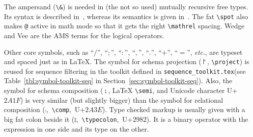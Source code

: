 \documentclass{article}
\newcommand{\emfile}[1]{\texttt{#1}}%
\newcommand{\seqtkfile}{\emfile{sequence\_toolkit.tex}}
\begin{document}
%
The ampersand (\verb|\&|) is needed in (the not so used) mutually
recursive free types. Its syntax is described in~\cite[8.2]{isoz},
whereas its semantics is given in~\cite[14.2.3.1]{isoz}.
The fat \verb|\spot| also makes \verb|@| active in math mode
so that it gets the right \verb|\mathrel| spacing.
Wedge and Vee are the AMS terms for the logical operators.

Other core symbols, such as ``$/$'', ``$;$'', ``$:$'', ``$,$'',
``$.$'', ``$+$'', ``$=$'', \textit{etc.}, are typeset and spaced
just as in \LaTeX. The symbol for schema projection ($\project$,
\verb|\project|) is reused for sequence filtering in the
toolkit defined in \seqtkfile (see Table~\ref{tbl:symbol-toolkit-seq} in Section~\ref{sec:symbol-toolkit-seq}).
Also, the symbol for schema composition ($\semi$, \LaTeX{} \verb|\semi|, and Unicode character U+$2A1F$)
is very similar (but slightly bigger) than the symbol for relational
composition ($\comp$,~\verb|\comp|,~U+$2A3E$). Type checked markup is
usually given with a big fat colon beside it ($\typecolon$,~\verb|\typecolon|,~U+$2982$).
It is a binary operator with the expression in one side and its type on the other.
%
\end{document}
